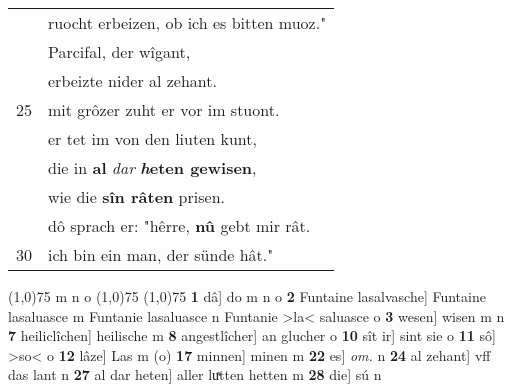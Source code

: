 \documentclass[8pt,a4paper,notitlepage]{article}
\begin{document}
\begin{table}[ht]
\begin{minipage}[t]{0.5\linewidth}
\begin{tabular}{rl}
 & ruocht erbeizen, ob ich es bitten muoz."\\ 
 & Parcifal, der wîgant,\\ 
 & erbeizte nider al zehant.\\ 
25 & mit grôzer zuht er vor im stuont.\\ 
 & er tet im von den liuten kunt,\\ 
 & die in \textbf{al} \textit{dar} \textbf{\textit{h}eten gewisen},\\ 
 & wie die \textbf{sîn râten} prisen.\\ 
 & dô sprach er: "hêrre, \textbf{nû} gebt mir rât.\\ 
30 & ich bin ein man, der sünde hât."\\ 
\end{tabular}
\scriptsize
\line(1,0){75} \newline
m n o \newline
\line(1,0){75} \newline
\newline
\line(1,0){75} \newline
\textbf{1} dâ] do m n o \textbf{2} Funtaine lasalvasche] Funtaine lasaluasce m Funtanie lasaluasce n Funtanie >la< saluasce o \textbf{3} wesen] wisen m n \textbf{7} heiliclîchen] heilische m \textbf{8} angestlîcher] an glucher o \textbf{10} sît ir] sint sie o \textbf{11} sô] >so< o \textbf{12} lâze] Las m (o) \textbf{17} minnen] minen m \textbf{22} es] \textit{om.} n \textbf{24} al zehant] vff das lant n \textbf{27} al dar heten] aller luͯtten hetten m \textbf{28} die] sú n \newline
\end{minipage}
\end{table}
\newpage
\end{document}

